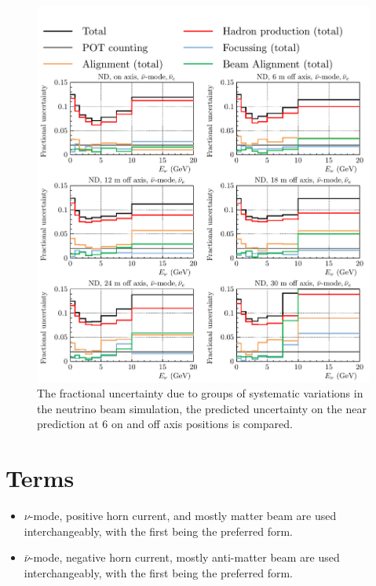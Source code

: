 \documentclass{article}
\begin{document}
\begin{figure}
  \centering
  \includegraphics[width=\textwidth]{plots/fracerrs/nubarmode_nuebar_ErrType_OffAxis}
  \caption{The fractional uncertainty due to groups of systematic variations in the neutrino beam simulation, the predicted uncertainty on the near prediction at 6 on and off axis positions is compared.}
  \label{fig:grp_nubar_nuebar_offaxis}
\end{figure}

\section{Terms}

\begin{itemize}
\item $\nu$-mode, positive horn current, and mostly matter beam are used interchangeably, with the first being the preferred form.
\item $\bar{\nu}$-mode, negative horn current, mostly anti-matter beam are used interchangeably, with the first being the preferred form.
\end{itemize}
\end{document}
